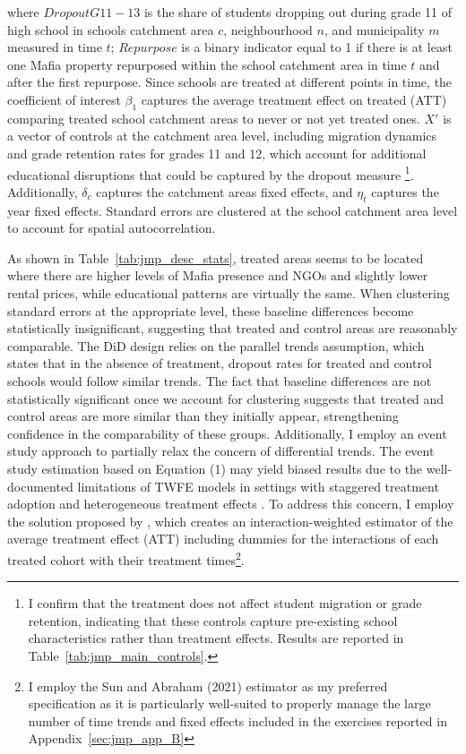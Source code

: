 \documentclass[12pt]{article}
\theoremstyle{plain}
\theoremstyle{plain}
\theoremstyle{plain}
\theoremstyle{definition}
\theoremstyle{plain}
\theoremstyle{definition}
\theoremstyle{plain}
\theoremstyle{remark}
\theoremstyle{definition}
\theoremstyle{definition}
\theoremstyle{plain}
\begin{document}
where $DropoutG11-13$ is the share of students dropping out during grade 11 of high school in schools catchment area $c$, neighbourhood $n$, and municipality $m$ measured in time $t$; $Repurpose$ is a binary indicator equal to 1 if there is at least one Mafia property repurposed within the school catchment area in time $t$ and after the first repurpose. Since schools are treated at different points in time, the coefficient of interest $\beta_1$ captures the average treatment effect on treated  (ATT) comparing treated school catchment areas to never or not yet treated ones. $X'$ is a vector of controls at the catchment area level, including migration dynamics and grade retention rates for grades 11 and 12, which account for additional educational disruptions that could be captured by the dropout measure \footnote{I confirm that the treatment does not affect student migration or grade retention, indicating that these controls capture pre-existing school characteristics rather than treatment effects. Results are reported in Table~\ref{tab:jmp_main_controls}.}. Additionally, $\delta_c$ captures the catchment areas fixed effects, and $\eta_{t}$ captures the year fixed effects. Standard errors are clustered at the school catchment area level to account for spatial autocorrelation. \par
 \medskip
As shown in Table~\ref{tab:jmp_desc_stats}, treated areas seems to be located  where there are higher levels of Mafia presence and NGOs and slightly lower rental prices, while educational patterns are virtually the same. When clustering standard errors at the appropriate level, these baseline differences become statistically insignificant, suggesting that treated and control areas are reasonably comparable.
The DiD design relies on the parallel trends assumption, which states that in the absence of treatment, dropout rates for treated and control schools would follow similar trends. The fact that baseline differences are not statistically significant once we account for clustering suggests that treated and control areas are more similar than they initially appear, strengthening confidence in the comparability of these groups. Additionally, I employ an event study approach to partially relax the concern of differential trends. The event study estimation based on Equation (1) may yield biased results due to the well-documented limitations of TWFE models in settings with staggered treatment adoption and heterogeneous treatment effects \citep{goodman-bacon_difference--differences_2021, sun_estimating_2021, callaway_difference--differences_2021}. To address this concern, I employ the solution proposed by \citet{sun_estimating_2021}, which creates an interaction-weighted estimator of the average treatment effect (ATT) including dummies for the interactions of each treated cohort with their treatment times\footnote{I employ the Sun and Abraham (2021) estimator as my preferred specification as it is particularly well-suited to properly manage the large number of time trends and fixed effects included in the exercises reported in Appendix~\ref{sec:jmp_app_B}}. \par
 \FloatBarrier
\end{document}

